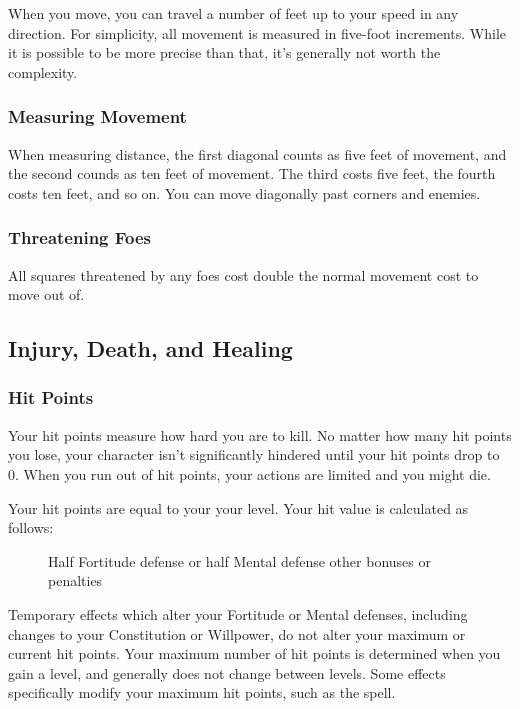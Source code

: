             When you move, you can travel a number of feet up to your speed in any direction.
            For simplicity, all movement is measured in five-foot increments.
            While it is possible to be more precise than that, it's generally not worth the complexity.

        \subsubsection{Measuring Movement}

             When measuring distance, the first diagonal counts as five feet of movement, and the second counds as ten feet of movement.
            The third costs five feet, the fourth costs ten feet, and so on.
            You can move diagonally past corners and enemies.

        \subsubsection{Threatening Foes}
            All squares threatened by any foes cost double the normal movement cost to move out of.

    \subsection{Injury, Death, and Healing}\label{Injury, Death, and Healing}

        \subsubsection{Hit Points}\label{Hit Points}
            Your hit points measure how hard you are to kill.
            No matter how many hit points you lose, your character isn't significantly hindered until your hit points drop to 0.
            When you run out of hit points, your actions are limited and you might die.

            Your hit points are equal to your  \x your level.
            Your hit value is calculated as follows:

            \begin{figure}[h]
                \centering Half Fortitude defense or half Mental defense \add other bonuses or penalties
            \end{figure}

             Temporary effects which alter your Fortitude or Mental defenses, including changes to your Constitution or Willpower, do not alter your maximum or current hit points.
            Your maximum number of hit points is determined when you gain a level, and generally does not change between levels.
            Some effects specifically modify your maximum hit points, such as the  spell.

